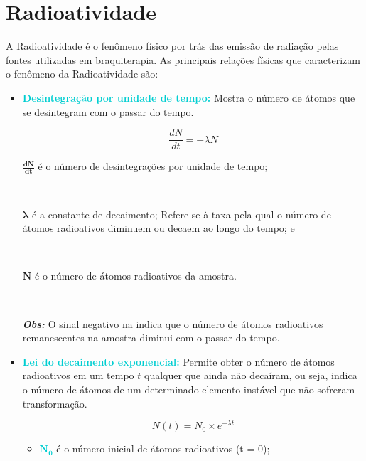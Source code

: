 \documentclass[11pt,a4paper]{article}
\newcounter{exemplo}
\begin{document}
	\section{Radioatividade}

		A Radioatividade é o fenômeno físico por trás das emissão de radiação pelas fontes utilizadas em braquiterapia. As principais relações físicas que caracterizam o fenômeno da Radioatividade são:

		\begin{itemize}
			\item \textcolor{DarkTurquoise}{\textbf{Desintegração por unidade de tempo:}} Mostra o número de átomos que se desintegram com o passar do tempo. 

				\begin{equation}
					\frac{dN}{dt} = -\lambda N
					\label{eq:DesintegracaoPorUnidadeDeTempo}
				\end{equation}
		
				\begin{exemplo}[onde:]
					\textcolor{CarnationPink}{$\mathbf{\frac{dN}{dt}}$} é o número de desintegrações por unidade de tempo;

					\

					\textcolor{CarnationPink}{$\mathbf{\lambda}$} é a constante de decaimento; Refere-se à taxa pela qual o número de átomos radioativos diminuem ou decaem ao longo do tempo; e

					\


					\textcolor{CarnationPink}{$\mathbf{N}$} é o número de átomos radioativos da amostra.

					\

					\textit{\textbf{\textcolor{CarnationPink}{Obs:}}} O sinal negativo na   indica que o número de átomos radioativos remanescentes na amostra diminui com o passar do tempo. 
				\end{exemplo}
				

			\item \textcolor{DarkTurquoise}{\textbf{Lei do decaimento exponencial:}} Permite obter o número de átomos radioativos em  um tempo $t$ qualquer que ainda não decaíram, ou seja, indica o número de átomos de um determinado elemento instável que não sofreram transformação.

				\begin{equation}
					N(t) = N_0 \times e^{-\lambda t}
					\label{eq:decaimentoExponencial}
				\end{equation}
				
				\begin{exemplo}[onde,]
				\begin{itemize}
					\item \textcolor{DarkTurquoise}{$\mathbf{N_0}$} é o número inicial de átomos radioativos (t = 0);
					

\end{itemize}
\end{exemplo}
\end{itemize}
\end{document}
